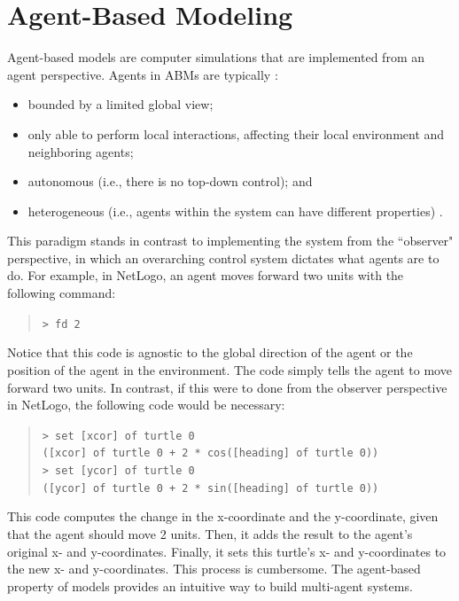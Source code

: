 \section{Agent-Based Modeling}
\label{sec:abm}
Agent-based models are computer simulations that are implemented from an agent perspective.
Agents in ABMs are typically \cite{epstein1999agent}:
\begin{itemize}
   \item bounded by a limited global view;
   \item only able to perform local interactions, affecting their local environment and neighboring agents;
   \item autonomous (i.e., there is no top-down control); and
   \item heterogeneous (i.e., agents within the system can have different properties) .
\end{itemize}
This paradigm stands in contrast to implementing the system from the ``observer" perspective, in which an overarching control system dictates what agents are to do.
For example, in NetLogo, an agent moves forward two units with the following command:
\begin{quote}
\texttt{\small > fd 2}
\end{quote}
Notice that this code is agnostic to the global direction of the agent or the position of the agent in the environment.
The code simply tells the agent to move forward two units.
In contrast, if this were to done from the observer perspective in NetLogo, the following code would be necessary:
\begin{quote}
\texttt{\small > set [xcor] of turtle 0\\
([xcor] of turtle 0 + 2 * cos([heading] of turtle 0))\\
> set [ycor] of turtle 0\\
([ycor] of turtle 0 + 2 * sin([heading] of turtle 0))}
\end{quote}
This code computes the change in the x-coordinate and the y-coordinate, given that the agent should move 2 units.
Then, it adds the result to the agent's original x- and y-coordinates.
Finally, it sets this turtle's x- and y-coordinates to the new x- and y-coordinates.
This process is cumbersome.
The agent-based property of models provides an intuitive way to build multi-agent systems.


